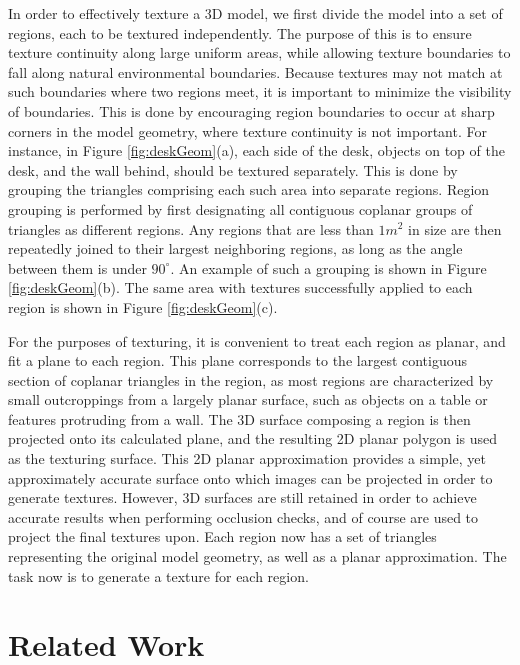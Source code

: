 \documentclass[]{spie}  %
\begin{document}
In order to effectively texture a 3D model, we first divide the model
into a set of regions, each to be textured independently. The purpose
of this is to ensure texture continuity along large uniform areas,
while allowing texture boundaries to fall along natural environmental
boundaries. Because textures may not match at such boundaries where
two regions meet, it is important to minimize the visibility of
boundaries. This is done by encouraging region boundaries to occur at
sharp corners in the model geometry, where texture continuity is not
important. For instance, in Figure \ref{fig:deskGeom}(a), each side of
the desk, objects on top of the desk, and the wall behind, should be
textured separately. This is done by grouping the triangles comprising
each such area into separate regions. Region grouping is performed by
first designating all contiguous coplanar groups of triangles as
different regions. Any regions that are less than $1 m^2$ in size are
then repeatedly joined to their largest neighboring regions, as long
as the angle between them is under $90^{\circ}$. An example of such a
grouping is shown in Figure \ref{fig:deskGeom}(b). The same area with
textures successfully applied to each region is shown in Figure
\ref{fig:deskGeom}(c).

For the purposes of texturing, it is convenient to treat each region
as planar, and fit a plane to each region. This plane corresponds to
the largest contiguous section of coplanar triangles in the region, as
most regions are characterized by small outcroppings from a largely
planar surface, such as objects on a table or features protruding from
a wall. The 3D surface composing a region is then projected onto its
calculated plane, and the resulting 2D planar polygon is used as the
texturing surface. This 2D planar approximation provides a simple, yet
approximately accurate surface onto which images can be projected in
order to generate textures. However, 3D surfaces are still retained in
order to achieve accurate results when performing occlusion checks,
and of course are used to project the final textures upon. Each region
now has a set of triangles representing the original model geometry,
as well as a planar approximation. The task now is to generate a
texture for each region.

\section{Related Work}
\label{sec:relatedWork}
\end{document}
